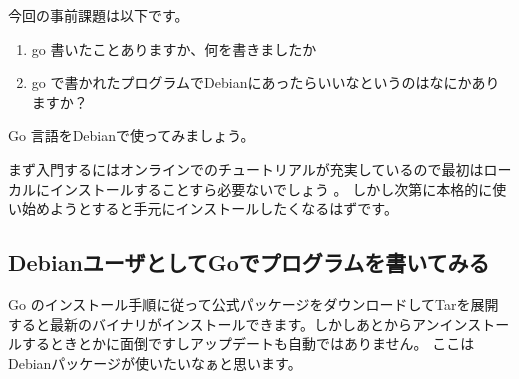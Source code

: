 \documentclass[mingoth,a4paper]{jsarticle}
\begin{document}


今回の事前課題は以下です。

\begin{enumerate}
 \item go 書いたことありますか、何を書きましたか
 \item go で書かれたプログラムでDebianにあったらいいなというのはなにかありますか？
\end{enumerate}


\begin{multicols}{2}
{\small
% 
}
\end{multicols}

%
%
%
%




Go 言語をDebianで使ってみましょう。

まず入門するにはオンラインでのチュートリアルが充実しているので最初はローカルにインストールすることすら必要ないでしょう\cite{golang:tourofgo}
\cite{golang:tourofgoja}。
しかし次第に本格的に使い始めようとすると手元にインストールしたくなるはずです。

\subsection{DebianユーザとしてGoでプログラムを書いてみる}

Go のインストール手順\cite{golangorg-install}に従って公式パッケージをダウンロードしてTarを展開すると最新のバイナリがインストールできます。しかしあとからアンインストールするときとかに面倒ですしアップデートも自動ではありません。
ここはDebianパッケージが使いたいなぁと思います。
\end{document}
